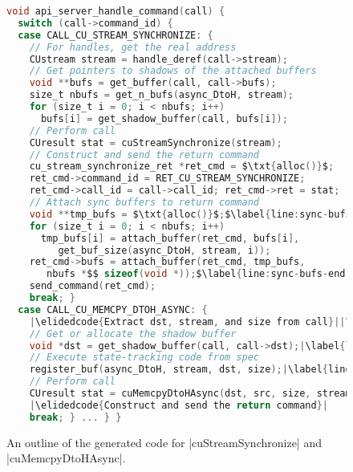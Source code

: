 
\begin{figure}
\begin{lstlisting}[language=C,columns=flexible,belowskip=-0.5em,aboveskip=-0.5em,mathescape,basicstyle={\scriptsize\ttfamily}]
void api_server_handle_command(call) {
  switch (call->command_id) {
  case CALL_CU_STREAM_SYNCHRONIZE: {
    // For handles, get the real address
    CUstream stream = handle_deref(call->stream);
    // Get pointers to shadows of the attached buffers
    void **bufs = get_buffer(call, call->bufs);
    size_t nbufs = get_n_bufs(async_DtoH, stream);
    for (size_t i = 0; i < nbufs; i++)
      bufs[i] = get_shadow_buffer(call, bufs[i]);
    // Perform call
    CUresult stat = cuStreamSynchronize(stream);
    // Construct and send the return command
    cu_stream_synchronize_ret *ret_cmd = $\txt{alloc()}$;
    ret_cmd->command_id = RET_CU_STREAM_SYNCHRONIZE;
    ret_cmd->call_id = call->call_id; ret_cmd->ret = stat;
    // Attach sync buffers to return command
    void **tmp_bufs = $\txt{alloc()}$;$\label{line:sync-bufs-start}$
    for (size_t i = 0; i < nbufs; i++)
      tmp_bufs[i] = attach_buffer(ret_cmd, bufs[i],
         get_buf_size(async_DtoH, stream, i));
    ret_cmd->bufs = attach_buffer(ret_cmd, tmp_bufs, 
       nbufs *$$ sizeof(void *));$\label{line:sync-bufs-end}$
    send_command(ret_cmd);
    break; }
  case CALL_CU_MEMCPY_DTOH_ASYNC: {
    |\elidedcode{Extract dst, stream, and size from call}||\label{line:extract-start}|
    // Get or allocate the shadow buffer
    void *dst = get_shadow_buffer(call, call->dst);|\label{line:extract-end}|
    // Execute state-tracking code from spec
    register_buf(async_DtoH, stream, dst, size);|\label{line:register-buf}|
    // Perform call
    CUresult stat = cuMemcpyDtoHAsync(dst, src, size, stream);
    |\elidedcode{Construct and send the return command}|
    break; } ... } }
\end{lstlisting}
\caption{An outline of the generated \worker code for \spec|cuStreamSynchronize| and \spec|cuMemcpyDtoHAsync|.
}
\label{fig:generated-code-outline-worker}
\vspace*{-.5em}
\end{figure}

